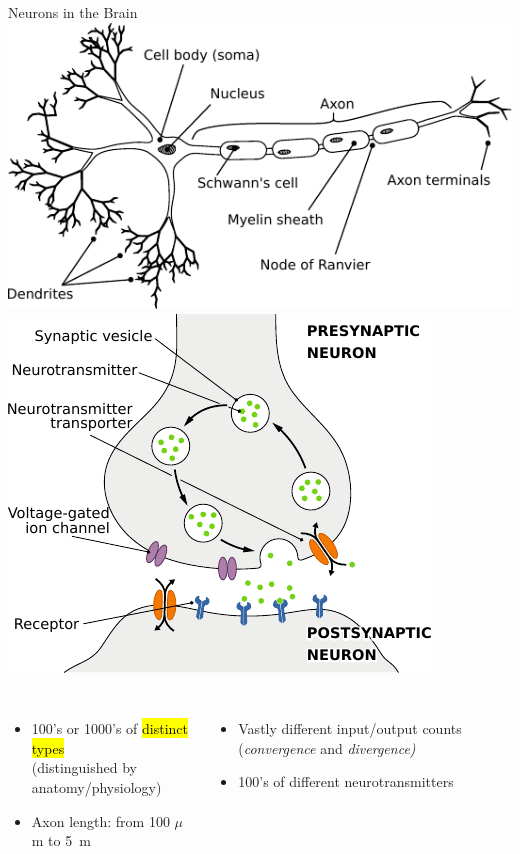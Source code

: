 \documentclass[handout,aspectratio=169]{beamer}
\begin{document}
\begin{frame}{Neurons in the Brain}
	\centering
	\includegraphics[scale=0.85]{media/neuron_sketch.pdf}
	\includegraphics[scale=0.85]{media/synapse_schematic.pdf}
	\begin{columns}[t]
		\begin{itemize}
			\item 100's or 1000's of \hl{distinct types}\\(distinguished by anatomy/physiology)
			\item Axon length: from 100 $\mu$m  to \SI{5}{\metre}
		\end{itemize}
		\begin{itemize}
			\item Vastly different input/output counts (\emph{convergence} and \emph{divergence)}
			\item 100's of different neurotransmitters
		\end{itemize}
	\end{columns}
\end{frame}
\end{document}
